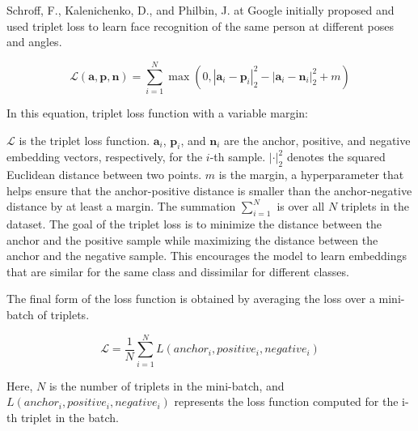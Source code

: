 Schroff, F., Kalenichenko, D., and Philbin, J. at Google initially proposed and used triplet loss to learn face recognition of the same person at different poses and angles. \cite{Schroff2015FaceNet:Clustering}

\begin{equation}
\mathcal{L}(\mathbf{a}, \mathbf{p}, \mathbf{n}) = \sum_{i=1}^{N} \max \left(0, \left| \mathbf{a}_i - \mathbf{p}_i \right|_2^2 - \left| \mathbf{a}_i - \mathbf{n}_i \right|_2^2 + m \right)
\end{equation}

In this equation, triplet loss function with a variable margin:

$\mathcal{L}$ is the triplet loss function.
$\mathbf{a}_i$, $\mathbf{p}_i$, and $\mathbf{n}_i$ are the anchor, positive, and negative embedding vectors, respectively, for the $i$-th sample.
$\left| \cdot \right|_2^2$ denotes the squared Euclidean distance between two points.
$m$ is the margin, a hyperparameter that helps ensure that the anchor-positive distance is smaller than the anchor-negative distance by at least a margin.
The summation $\sum_{i=1}^{N}$ is over all $N$ triplets in the dataset.
The goal of the triplet loss is to minimize the distance between the anchor and the positive sample while maximizing the distance between the anchor and the negative sample. This encourages the model to learn embeddings that are similar for the same class and dissimilar for different classes.

The final form of the loss function is obtained by averaging the loss over a mini-batch of triplets. 

\begin{equation}
\mathcal{L} = \frac{1}{N} \sum_{i=1}^{N} L(anchor_i, positive_i, negative_i)
\end{equation}

Here, $N$ is the number of triplets in the mini-batch, and $L(anchor_i, positive_i, negative_i)$ represents the loss function computed for the i-th triplet in the batch.
